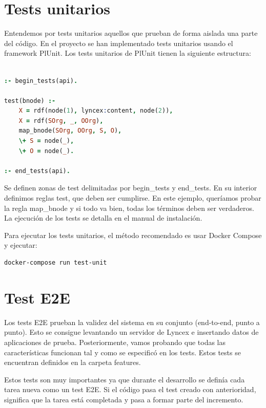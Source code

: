 \documentclass[12pt]{report} %
\begin{document}
\section{Tests unitarios}

Entendemos por tests unitarios aquellos que prueban de forma aislada una parte del código. En el proyecto se han implementado tests unitarios usando el framework PlUnit. Los tests unitarios de PlUnit tienen la siguiente estructura:

\begin{lstlisting}[language=Prolog]

:- begin_tests(api).

test(bnode) :-
    X = rdf(node(1), lyncex:content, node(2)),
    X = rdf(SOrg, _, OOrg),
    map_bnode(SOrg, OOrg, S, O),
    \+ S = node(_),
    \+ O = node(_).

:- end_tests(api).

\end{lstlisting}

Se definen zonas de test delimitadas por begin\_tests y end\_tests. En su interior definimos reglas test, que deben ser cumplirse. En este ejemplo, queríamos probar la regla map\_bnode y si todo va bien, todas los términos deben ser verdaderos. La ejecución de los tests se detalla en el manual de instalación.

Para ejecutar los tests unitarios, el método recomendado es usar Docker Compose y ejecutar:

\begin{verbatim}
docker-compose run test-unit
\end{verbatim}

\section{Test E2E}

Los tests E2E prueban la validez del sistema en su conjunto (end-to-end, punto a punto). Esto se consigue levantando un servidor de Lyncex e insertando datos de aplicaciones de prueba. Posteriormente, vamos probando que todas las características funcionan tal y como se especificó en los tests. Estos tests se encuentran definidos en la carpeta features.

Estos tests son muy importantes ya que durante el desarrollo se definía cada tarea nueva como un test E2E. Si el código pasa el test creado con anterioridad, significa que la tarea está completada y pasa a formar parte del incremento.
\end{document}
